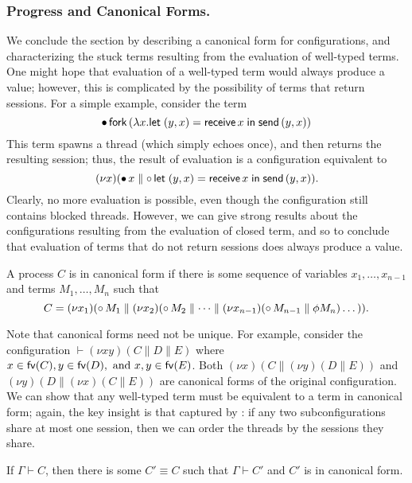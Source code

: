 \documentclass[oribibl,orivec,envcountsame]{llncs}
\begin{document}
\subsubsection{Progress and Canonical Forms.}

We conclude the section by describing a canonical form for configurations, and characterizing the
stuck terms resulting from the evaluation of well-typed terms.  One might hope that evaluation of a
well-typed term would always produce a value; however, this is complicated by the possibility of
terms that return sessions.  For a simple example, consider the term
%
\[
  {\mathord{\bullet}}\,\mathsf{fork} \, (\lambda x. \mathsf{let}\;(y,x) = \mathsf{receive} \, x\;\mathsf{in}\;\mathsf{send} \, (y,x))
\]
%
This term spawns a thread (which simply echoes once), and then returns the resulting session; thus,
the result of evaluation is a configuration equivalent to
\[
  (\nu x)({\mathord{\bullet}}\,x \parallel {\mathord{\circ}}\,\mathsf{let}\;(y,x) = \mathsf{receive} \, x\;\mathsf{in}\;\mathsf{send} \, (y,x)).
\]
Clearly, no more evaluation is possible, even though the configuration still contains blocked
threads.  However, we can give strong results about the configurations resulting from the evaluation
of closed term, and so to conclude that evaluation of terms that do not return sessions does always
produce a value.

\begin{definition}
A process $C$ is in canonical form if there is some sequence of variables $x_1,\dots,x_{n-1}$ and
terms $M_1,\dots,M_n$ such that
\[
  C = (\nu x_1)({\mathord{\circ}}\,M_1 \parallel (\nu x_2)({\mathord{\circ}}\,M_2 \parallel \dots \parallel (\nu x_{n-1})({\mathord{\circ}}\,M_{n-1} \parallel \phi M_n)\dots)).
\]
\end{definition}

Note that canonical forms need not be unique.  For example, consider the configuration $\vdash (\nu
xy)(C \parallel D \parallel E)$ where $x \in \mathsf{fv}(C), y \in \mathsf{fv}(D), \text{ and } x,y \in \mathsf{fv}(E)$.
Both $(\nu x)(C \parallel (\nu y)(D \parallel E))$ and $(\nu y)(D \parallel (\nu x)(C \parallel E))$
are canonical forms of the original configuration.  We can show that any well-typed term must be
equivalent to a term in canonical form; again, the key insight is that captured by
: if any two subconfigurations share at most one session, then we
can order the threads by the sessions they share.

\begin{lemma}\label{lem:canonical}
  If $\Gamma \vdash C$, then there is some $C' \equiv C$ such that $\Gamma \vdash C'$ and $C'$ is in
  canonical form.
\end{lemma}
\end{document}

